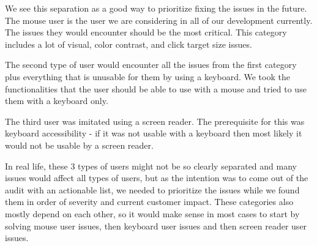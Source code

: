 \documentclass{master_thesis}
\begin{document}
We see this separation as a good way to prioritize fixing the issues in the future. The mouse user is the user we are considering in all of our development currently. The issues they would encounter should be the most critical. This category includes a lot of visual, color contrast, and click target size issues.

The second type of user would encounter all the issues from the first category plus everything that is unusable for them by using a keyboard. We took the functionalities that the user should be able to use with a mouse and tried to use them with a keyboard only.

The third user was imitated using a screen reader. The prerequisite for this was keyboard accessibility - if it was not usable with a keyboard then most likely it would not be usable by a screen reader.

In real life, these 3 types of users might not be so clearly separated and many issues would affect all types of users, but as the intention was to come out of the audit with an actionable list, we needed to prioritize the issues while we found them in order of severity and current customer impact. These categories also mostly depend on each other, so it would make sense in most cases to start by solving mouse user issues, then keyboard user issues and then screen reader user issues.
\end{document}
